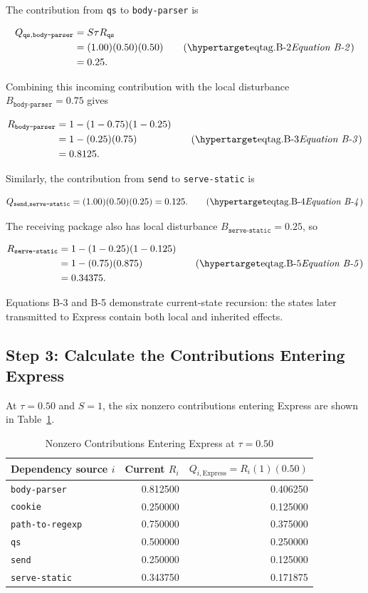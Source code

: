 The contribution from \texttt{qs} to \texttt{body-parser} is

\[
\begin{aligned}
Q_{\texttt{qs},\texttt{body-parser}}
 &=S\tau R_{\texttt{qs}} \\
 &=(1.00)(0.50)(0.50) \\
 &=0.25.
\end{aligned}
\eqtag{B-2}
\]

Combining this incoming contribution with the local disturbance
\(B_{\texttt{body-parser}}=0.75\) gives

\[
\begin{aligned}
R_{\texttt{body-parser}}
 &=1-(1-0.75)(1-0.25) \\
 &=1-(0.25)(0.75) \\
 &=0.8125.
\end{aligned}
\eqtag{B-3}
\]

Similarly, the contribution from \texttt{send} to \texttt{serve-static} is

\[
Q_{\texttt{send},\texttt{serve-static}}
 =(1.00)(0.50)(0.25)=0.125.
\eqtag{B-4}
\]

The receiving package also has local disturbance
\(B_{\texttt{serve-static}}=0.25\), so

\[
\begin{aligned}
R_{\texttt{serve-static}}
 &=1-(1-0.25)(1-0.125) \\
 &=1-(0.75)(0.875) \\
 &=0.34375.
\end{aligned}
\eqtag{B-5}
\]

Equations B-3 and B-5 demonstrate current-state recursion: the states later
transmitted to Express contain both local and inherited effects.

\subsection{Step 3: Calculate the Contributions Entering Express}

At \(\tau=0.50\) and \(S=1\), the six nonzero contributions entering
Express are shown in Table~\ref{tab:app-software-contributions}.

\begin{table}[H]
\caption{Nonzero Contributions Entering Express at \(\tau=0.50\)}
\label{tab:app-software-contributions}
\centering
\small
\begin{tabular*}{0.86\textwidth}{@{\extracolsep{\fill}}lrr}
\toprule
Dependency source \(i\) & Current \(R_i\) & \(Q_{i,\mathrm{Express}}=R_i(1)(0.50)\) \\
\midrule
\texttt{body-parser} & 0.812500 & 0.406250 \\
\texttt{cookie} & 0.250000 & 0.125000 \\
\texttt{path-to-regexp} & 0.750000 & 0.375000 \\
\texttt{qs} & 0.500000 & 0.250000 \\
\texttt{send} & 0.250000 & 0.125000 \\
\texttt{serve-static} & 0.343750 & 0.171875 \\
\bottomrule
\end{tabular*}
\end{table}

